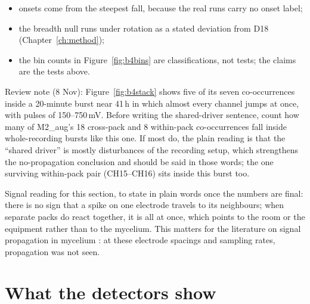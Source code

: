 \begin{instructions}
\begin{itemize}
  \item onsets come from the steepest fall, because the real runs carry no onset label;
  \item the breadth null runs under rotation as a stated deviation from D18 (Chapter~\ref{ch:method});
  \item the bin counts in Figure~\ref{fig:b4bins} are classifications, not tests; the claims are the tests above.
\end{itemize}
Review note (8 Nov): Figure~\ref{fig:b4stack} shows five of its seven co-occurrences inside a 20-minute burst near
41\,h in which almost every channel jumps at once, with pulses of 150--750\,mV. Before writing the shared-driver
sentence, count how many of M2\_aug's 18 cross-pack and 8 within-pack co-occurrences fall inside whole-recording
bursts like this one. If most do, the plain reading is that the ``shared driver'' is mostly disturbances of the
recording setup, which strengthens the no-propagation conclusion and should be said in those words; the one surviving
within-pack pair (CH15--CH16) sits inside this burst too.
\end{instructions}

\begin{instructions}
Signal reading for this section, to state in plain words once the numbers are final: there is no sign that a spike on
one electrode travels to its neighbours; when separate packs do react together, it is all at once, which points to the
room or the equipment rather than to the mycelium. This matters for the literature on signal propagation in mycelium
\cite{mayne,phillips}: at these electrode spacings and sampling rates, propagation was not seen.
\end{instructions}

\section{What the detectors show}
\label{sec:rb_detectors}

